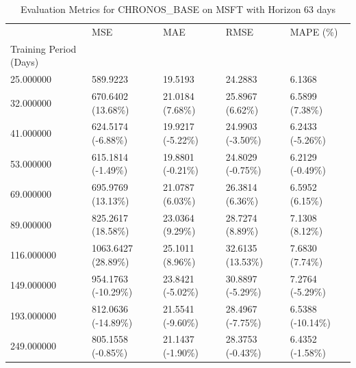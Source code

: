 \begin{table}
\caption{Evaluation Metrics for CHRONOS_BASE on MSFT with Horizon 63 days}
\label{tab:chronos_base_MSFT_h63_metrics}
\begin{tabular}{lllll}
\toprule
 & MSE & MAE & RMSE & MAPE (\%) \\
Training Period (Days) &  &  &  &  \\
\midrule
25.000000 & 589.9223 & 19.5193 & 24.2883 & 6.1368 \\
32.000000 & 670.6402 (13.68\%) & 21.0184 (7.68\%) & 25.8967 (6.62\%) & 6.5899 (7.38\%) \\
41.000000 & 624.5174 (-6.88\%) & 19.9217 (-5.22\%) & 24.9903 (-3.50\%) & 6.2433 (-5.26\%) \\
53.000000 & 615.1814 (-1.49\%) & 19.8801 (-0.21\%) & 24.8029 (-0.75\%) & 6.2129 (-0.49\%) \\
69.000000 & 695.9769 (13.13\%) & 21.0787 (6.03\%) & 26.3814 (6.36\%) & 6.5952 (6.15\%) \\
89.000000 & 825.2617 (18.58\%) & 23.0364 (9.29\%) & 28.7274 (8.89\%) & 7.1308 (8.12\%) \\
116.000000 & 1063.6427 (28.89\%) & 25.1011 (8.96\%) & 32.6135 (13.53\%) & 7.6830 (7.74\%) \\
149.000000 & 954.1763 (-10.29\%) & 23.8421 (-5.02\%) & 30.8897 (-5.29\%) & 7.2764 (-5.29\%) \\
193.000000 & 812.0636 (-14.89\%) & 21.5541 (-9.60\%) & 28.4967 (-7.75\%) & 6.5388 (-10.14\%) \\
249.000000 & 805.1558 (-0.85\%) & 21.1437 (-1.90\%) & 28.3753 (-0.43\%) & 6.4352 (-1.58\%) \\
\bottomrule
\end{tabular}
\end{table}

